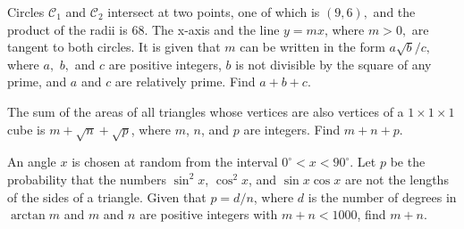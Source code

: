 \documentclass[11pt]{article}
\theoremstyle{definition}
\begin{document}
%	







\begin{question}[name={2002 AIME II, \href{https://artofproblemsolving.com/community/c4p714643}{Problem 15}}]
	Circles $\mathcal{C}_{1}$ and $\mathcal{C}_{2}$ intersect at two points, one of which is $(9,6),$ and the product of the radii is $68.$ The x-axis and the line $y=mx$, where $m>0,$ are tangent to both circles. It is given that $m$ can be written in the form $a\sqrt{b}/c,$ where $a,$ $b,$ and $c$ are positive integers, $b$ is not divisible by the square of any prime, and $a$ and $c$ are relatively prime. Find $a+b+c$.	
\end{question}


%	









\begin{question}[name={2003 AIME I, \href{https://artofproblemsolving.com/community/c4p509046}{Problem 6}}]
	The sum of the areas of all triangles whose vertices are also vertices of a $1\times 1 \times 1$ cube is $m+\sqrt{n}+\sqrt{p}$, where $m$, $n$, and $p$ are integers. Find $m+n+p$.
\end{question}


%	













\begin{question}[name={2003 AIME I, \href{https://artofproblemsolving.com/community/c4p509430}{Problem 11}}]
	An angle $x$ is chosen at random from the interval $0^\circ < x < 90^\circ$. Let $p$ be the probability that the numbers $\sin^2 x$, $\cos^2 x$, and $\sin x \cos x$ are not the lengths of the sides of a triangle. Given that $p = d/n$, where $d$ is the number of degrees in $\arctan m$ and $m$ and $n$ are positive integers with $m + n < 1000$, find $m + n$.	
\end{question}
\end{document}
